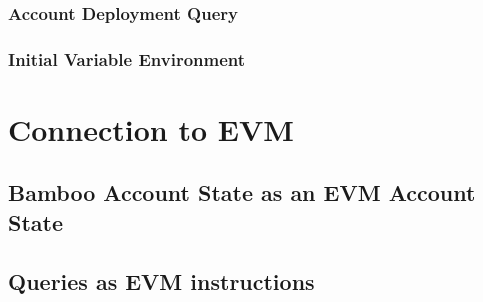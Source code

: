 \documentclass{book}
\begin{document}
\subsection{Account Deployment Query}

\subsection{Initial Variable Environment}

\chapter{Connection to EVM}

\section{Bamboo Account State as an EVM Account State}

\section{Queries as EVM instructions}
\end{document}
